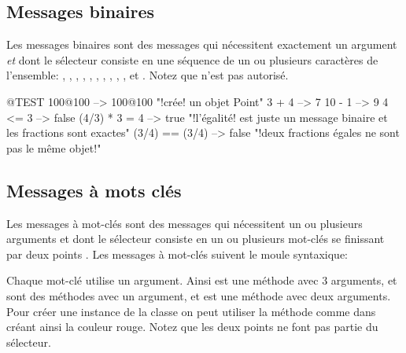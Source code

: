 \documentclass[a4paper,10pt,twoside]{book}
\begin{document}

\subsection{Messages binaires} 
Les messages binaires sont des messages qui n\'ecessitent exactement un argument \emph{et} dont le s\'electeur consiste en une s\'equence de un ou plusieurs caract\`eres de l'ensemble: \ct{+}, \ct{-}, \ct{*}, \ct{/}, \ct{&}, \ct{=}, \ct{>}, \ct{|}, \ct{<}, \ct{~}, et . Notez que \ct{--} n'est pas autoris\'e.

\begin{code}{@TEST}
100@100      --> 100@100  "!cr\'ee! un objet Point"
3 + 4              --> 7
10 - 1            --> 9
4 <= 3            --> false
(4/3) * 3 = 4   --> true  "!l'\'egalit\'e! est juste un message binaire et les fractions sont exactes"
(3/4) == (3/4) --> false  "!deux fractions \'egales ne sont pas le m\^eme objet!"
\end{code}


\subsection{Messages \`a mots cl\'es}

Les messages \`a mot-cl\'es sont des messages qui n\'ecessitent un ou plusieurs arguments et dont le s\'electeur consiste en un ou plusieurs mot-cl\'es se finissant par deux points \ct{:}.  Les messages \`a mot-cl\'es suivent le moule syntaxique: 

Chaque mot-cl\'e utilise un argument. Ainsi  est une
m\'ethode avec 3 arguments,  et  sont des
m\'ethodes avec un argument, et  est une m\'ethode avec
deux arguments. Pour cr\'eer une instance de la classe  on
peut utiliser la m\'ethode  comme dans  cr\'eant ainsi la couleur rouge. Notez que les deux points ne font pas partie du s\'electeur.
\end{document}
